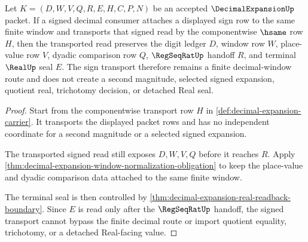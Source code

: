 \begin{theorem}
\label{thm:decimal-expansion-signed-window-transport}
Let $K=(D,W,V,Q,R,E,H,C,P,N)$ be an accepted $\DecimalExpansionUp$ packet. If a signed decimal consumer attaches a displayed sign row to the same finite window and transports that signed read by the componentwise $\hsame$ row $H$, then the transported read preserves the digit ledger $D$, window row $W$, place-value row $V$, dyadic comparison row $Q$, $\RegSeqRatUp$ handoff $R$, and terminal $\RealUp$ seal $E$. The sign transport therefore remains a finite decimal-window route and does not create a second magnitude, selected signed expansion, quotient real, trichotomy decision, or detached Real seal.
\end{theorem}
\begin{proof}
Start from the componentwise transport row $H$ in \autoref{def:decimal-expansion-carrier}. It transports the displayed packet rows and has no independent coordinate for a second magnitude or a selected signed expansion.

The transported signed read still exposes $D,W,V,Q$ before it reaches $R$. Apply \autoref{thm:decimal-expansion-window-normalization-obligation} to keep the place-value and dyadic comparison data attached to the same finite window.

The terminal seal is then controlled by \autoref{thm:decimal-expansion-real-readback-boundary}. Since $E$ is read only after the $\RegSeqRatUp$ handoff, the signed transport cannot bypass the finite decimal route or import quotient equality, trichotomy, or a detached Real-facing value.
\end{proof}

